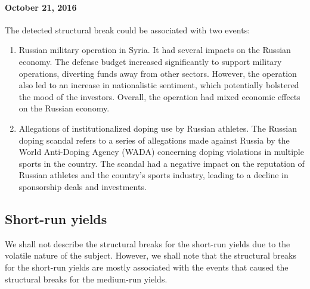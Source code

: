             \paragraph{October 21, 2016} The detected structural break could be associated with two events:
            \begin{enumerate}
                \item Russian military operation in Syria. It had several impacts on the Russian economy. The defense budget increased significantly 
                to support military operations, diverting funds away from other sectors. However, the operation also led to an increase 
                in nationalistic sentiment, which potentially bolstered the mood of the investors. Overall, the operation 
                had mixed economic effects on the Russian economy.
                \item Allegations of institutionalized doping use by Russian athletes. The Russian doping scandal refers to a series of 
                allegations made against Russia by the World Anti-Doping Agency (WADA) concerning doping violations in multiple sports 
                in the country. The scandal had a negative impact on the reputation of Russian athletes and the country's sports industry, 
                leading to a decline in sponsorship deals and investments.
            \end{enumerate}

    \subsection{Short-run yields}
        We shall not describe the structural breaks for the short-run yields due to the volatile nature of the subject. However, we shall 
        note that the structural breaks for the short-run yields are mostly associated with the events that caused the structural breaks 
        for the medium-run yields.

